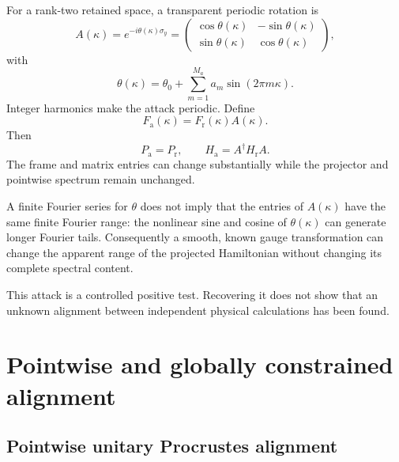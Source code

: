For a rank-two retained space, a transparent periodic rotation is
\begin{equation}
  A(\kappa)
  =e^{-i\theta(\kappa)\sigma_y}
  =\begin{pmatrix}
      \cos\theta(\kappa)&-\sin\theta(\kappa)\\
      \sin\theta(\kappa)& \cos\theta(\kappa)
    \end{pmatrix},
  \label{eq:training-composite-attack}
\end{equation}
with
\begin{equation}
  \theta(\kappa)
  =\theta_0+\sum_{m=1}^{M_a}a_m\sin(2\pi m\kappa).
  \label{eq:training-composite-attack-angle}
\end{equation}
Integer harmonics make the attack periodic. Define
\begin{equation}
  F_{\mathrm a}(\kappa)=F_{\mathrm r}(\kappa)A(\kappa).
  \label{eq:training-composite-attacked-frame}
\end{equation}
Then
\begin{equation}
  P_{\mathrm a}=P_{\mathrm r},
  \qquad
  H_{\mathrm a}=A^{\dagger}H_{\mathrm r}A.
  \label{eq:training-composite-attack-invariants}
\end{equation}
The frame and matrix entries can change substantially while the projector and
pointwise spectrum remain unchanged.

A finite Fourier series for $\theta$ does not imply that the entries of
$A(\kappa)$ have the same finite Fourier range: the nonlinear sine and cosine
of $\theta(\kappa)$ can generate longer Fourier tails. Consequently a smooth,
known gauge transformation can change the apparent range of the projected
Hamiltonian without changing its complete spectral content.

This attack is a controlled positive test. Recovering it does not show that an
unknown alignment between independent physical calculations has been found.

\section{Pointwise and globally constrained alignment}

\subsection{Pointwise unitary Procrustes alignment}

